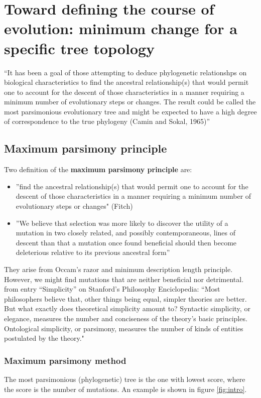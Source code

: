 \graphicspath{{chapters/12/images}}
\chapter{Toward defining the course of evolution: minimum change for a specific tree topology}
“It has been a goal of those attempting to deduce phylogenetic relationshps on biological characteristics to find the ancestral relationship(s) that would permit one to account for the descent of those characteristics in a manner requiring a minimum number of evolutionary steps or changes.
The result could be called the most parsimonious evolutionary tree and might be expected to have a high degree of correspondence to the true phylogeny (Camin and Sokal, 1965)”

\section{Maximum parsimony principle}
Two definition of the \textbf{maximum parsimony principle} are:
\begin{itemize}
\item ”find the ancestral relationship(s) that would permit one to account for the descent of those characteristics in a manner requiring a minimum number of evolutionary steps or changes" (Fitch)
\item ”We believe that selection was more likely to discover the utility of a
mutation in two closely related, and possibly contemporaneous, lines of
descent than that a mutation once found beneficial should then become
deleterious relative to its previous ancestral form”
\end{itemize}

They arise from Occam’s razor and minimum description length principle. However, we might find mutations that are neither beneficial nor detrimental.
\\
from entry “Simplicity” on Stanford’s Philosophy Enciclopedia:
“Most philosophers believe that, other things being equal, simpler theories are better. But what exactly does theoretical simplicity amount to? Syntactic simplicity, or elegance, measures the number and conciseness of the theory's basic principles. Ontological simplicity, or parsimony, measures the number of kinds of entities postulated by the theory."

\subsection{Maximum parsimony method}
The most parsimonious (phylogenetic) tree is the one with lowest score, where the score is the number of mutations. An example is shown in figure \ref{fig:intro}.

